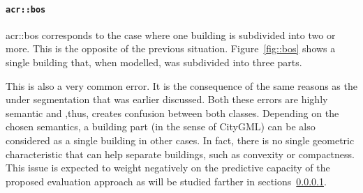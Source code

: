             \paragraph{\texttt{\acrlong*{acr::bos}}}
                \gls{acr::bos} corresponds to the case where one building is subdivided into two or more.
                This is the opposite of the previous situation.
                Figure~\ref{fig::bos} shows a single building that, when modelled, was subdivided into three parts.\\

                \begin{figure}[H]
                    \centering
                \end{figure}

                This is also a very common error.
                It is the consequence of the same reasons as the under segmentation that was earlier discussed.
                Both these errors are highly semantic and ,thus, creates confusion between both classes.
                Depending on the chosen semantics, a building part (in the sense of CityGML) can be also considered as a single building in other cases.
                In fact, there is no single geometric characteristic that can help separate buildings, such as convexity or compactness.
                This issue is expected to weight negatively on the predictive capacity of the proposed evaluation approach as will be studied farther in sections~\ref{}.

